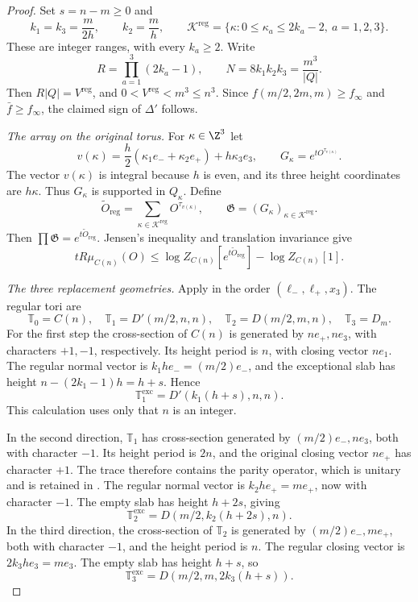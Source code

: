 \begin{proof}
Set $s=n-m\ge0$ and
\[
 k_1=k_3=\frac{m}{2h},\qquad k_2=\frac mh,\qquad
 \mathcal K^{\mathrm{reg}}=
   \{\kappa:0\le\kappa_a\le2k_a-2,\ a=1,2,3\}.
\]
These are integer ranges, with every $k_a\ge2$. Write
\[
 R=\prod_{a=1}^3(2k_a-1),\qquad
 N=8k_1k_2k_3=\frac{m^3}{|Q|}.
\]
Then $R|Q|=V^{\mathrm{reg}}$, and
$0<V^{\mathrm{reg}}<m^3\le n^3$. Since
$f(m/2,2m,m)\ge f_\infty$ and $\bar f\ge f_\infty$,
the claimed sign of $\Delta'$ follows.

\emph{The array on the original torus.}
For $\kappa\in\Z^3$ let
\[
 v(\kappa)=\frac h2(\kappa_1e_-+\kappa_2e_+)
                         +h\kappa_3e_3,\qquad
 G_\kappa=e^{tO^{\tau_{v(\kappa)}}}.
\]
The vector $v(\kappa)$ is integral because $h$ is even, and its
three height coordinates are $h\kappa$. Thus $G_\kappa$ is
supported in $Q_\kappa$. Define
\[
 \widetilde O_{\mathrm{reg}}
     =\sum_{\kappa\in\mathcal K^{\mathrm{reg}}}
                               O^{\tau_{v(\kappa)}},\qquad
 \mathfrak G=(G_\kappa)_{\kappa\in\mathcal K^{\mathrm{reg}}}.
\]
Then $\prod\mathfrak G=e^{t\widetilde O_{\mathrm{reg}}}$.
Jensen's inequality and translation invariance give
\begin{equation}\label{eq:sides-jensen}
 tR\mu_{C(n)}(O)
 \le\log Z_{C(n)}[e^{t\widetilde O_{\mathrm{reg}}}]
                            -\log Z_{C(n)}[1].
\end{equation}

\emph{The three replacement geometries.}
Apply  in the order
$(\ell_-,\ell_+,x_3)$. The regular tori are
\[
 \mathbb T_0=C(n),\quad
 \mathbb T_1=D'(m/2,n,n),\quad
 \mathbb T_2=D(m/2,m,n),\quad
 \mathbb T_3=D_m.
\]
For the first step the cross-section of $C(n)$ is generated by
$ne_+,ne_3$, with characters $+1,-1$, respectively. Its height
period is $n$, with closing vector $ne_1$. The regular normal
vector is $k_1he_-=(m/2)e_-$, and the exceptional slab has height
$n-(2k_1-1)h=h+s$. Hence
\[
 \mathbb T_1^{\mathrm{exc}}=D'(k_1(h+s),n,n).
\]
This calculation uses only that $n$ is an integer.

In the second direction, $\mathbb T_1$ has cross-section generated
by $(m/2)e_-,ne_3$, both with character $-1$. Its height period is
$2n$, and the original closing vector $ne_+$ has character $+1$.
The trace therefore contains the parity operator, which is unitary
and is retained in . The regular
normal vector is $k_2he_+=me_+$, now with character $-1$.
The empty slab has height $h+2s$, giving
\[
 \mathbb T_2^{\mathrm{exc}}=D(m/2,k_2(h+2s),n).
\]
In the third direction, the cross-section of $\mathbb T_2$ is
generated by $(m/2)e_-,me_+$, both with character $-1$, and the
height period is $n$. The regular closing vector is $2k_3he_3=me_3$.
The empty slab has height $h+s$, so
\[
 \mathbb T_3^{\mathrm{exc}}=D(m/2,m,2k_3(h+s)).
\]


\end{proof}

